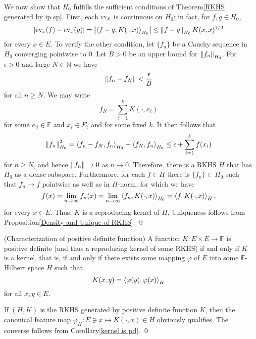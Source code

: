 \documentclass[a4paper,12pt]{article}
\begin{document}
\begin{prf}
	We now show that \( H_0 \) fulfills the sufficient conditions of Theorem\ref{RKHS generated by ip sp}. First, each \( \mathrm{ev}_{x} \) is continuous on \( H_0 \); in fact, for \( f, g \in H_0 \),
	\begin{equation*}
		\left| \mathrm{ev}_{x}(f)- \mathrm{ev}_{x}(g) \right| = \left| \left<f-g, K(\cdot ,x) \right>_{H_0} \right| \le \left\| f-g \right\|_{H_0}K(x,x)^{1/2}
	\end{equation*}
	for every \( x \in E \). To verify the other condition, let \( \{f_n\} \) be a Cauchy sequence in \( H_0 \) converging pointwise to 0. Let \( B>0 \) be an upper bound for \( \left\| f_n \right\|_{H_0} \). For \( \epsilon>0 \) and large \( N \in \mathbb{N} \) we have
	\begin{equation*}
		\left\| f_n - f_N \right\| < \frac{\epsilon}{B}
	\end{equation*}
	for all \( n \ge N \). We may write
	\begin{equation*}
		f_N = \sum_{i=1}^{k} K(\cdot ,x_i)
	\end{equation*}
	for some \( \alpha_i \in \mathbb{F} \) and \( x_i \in E \), and for some fixed \( k \). It then follows that
	\begin{equation*}
		\left\| f_n \right\|^2_{H_0} = \left<f_n- f_N, f_n \right>_{H_0} + \left<f_N, f_n \right>_{H_0}
		\le \epsilon + \sum_{i=1}^{k}f(x_i)
	\end{equation*}
	for \( n \ge N \), and hence \( \left\| f_n \right\|\to 0 \) as \( n \to 0 \). Therefore, there is a RKHS \( H \) that has \( H_0 \) as a dense subspace.
	Furthermore, for each \( f \in H \) there is \( \{f_n\} \subset H_0 \) such that \( f_n \to f \) pointwise as well as in \( H \)-norm, for which we have
	\begin{equation*}
		f(x) = \lim_{n \to \infty} f_n(x)= \lim_{n \to \infty} \left<f_n, K(\cdot ,x) \right>_{H_0} = \left<f, K(\cdot ,x) \right>_H,
	\end{equation*}
	for every \( x \in E \). Thus, \( K \) is a reproducing kernel of \( H \). Uniqueness follows from Proposition\ref{Density and Unique of RKHS}.
	\qed\end{prf}

\begin{thm} (Characterization of positive definite function)\label{Characterization of pd}
	A function \( K:E \times E \to \mathbb{F} \) is positive definite (and thus a reproducing kernel of some RKHS) if and only if \( K \) is a kernel, that is, if and only if there exists some mapping \( \varphi \) of \( E \) into some  \( \mathbb{F} \)-Hilbert space \( H \) such that
	\begin{equation*}
		K(x,y) = \left<\varphi(y), \varphi(x) \right>_H
	\end{equation*}
	for all \( x,y \in E \).
\end{thm}
\begin{prf}
	If \( (H,K) \) is the RKHS generated by positive definite function \( K \), then the canonical feature map \( \varphi_K:E \ni x \mapsto K(\cdot ,x) \in H \) obviously qualifies. The converse follows from Corollary\ref{kernel is pd}.
	\qed\end{prf}
\end{document}
